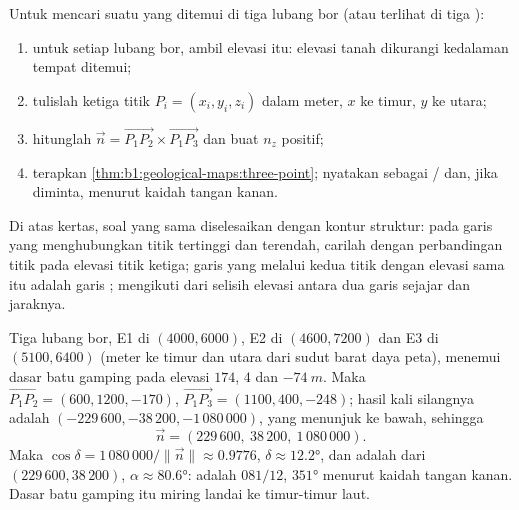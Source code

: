\begin{method}\label{met:b1:geological-maps:three-point}
Untuk mencari  suatu  yang ditemui di tiga lubang bor (atau terlihat di tiga ):
\begin{enumerate}
  \item untuk setiap lubang bor, ambil elevasi  itu: elevasi tanah dikurangi kedalaman tempat  ditemui;
  \item tulislah ketiga titik $P_i = (x_i, y_i, z_i)$ dalam meter, $x$ ke timur, $y$ ke utara;
  \item hitunglah $\vec n = \overrightarrow{P_1P_2} \times
        \overrightarrow{P_1P_3}$ dan buat $n_z$ positif;
  \item terapkan \cref{thm:b1:geological-maps:three-point}; nyatakan  sebagai / dan, jika diminta,  menurut kaidah tangan kanan.
\end{enumerate}
Di atas kertas, soal yang sama diselesaikan dengan kontur struktur: pada garis yang menghubungkan titik tertinggi dan terendah, carilah dengan perbandingan titik pada elevasi titik ketiga; garis yang melalui kedua titik dengan elevasi sama itu adalah garis ;  mengikuti dari selisih elevasi antara dua garis  sejajar dan jaraknya.
\end{method}

\begin{example}\label{ex:b1:geological-maps:east}
Tiga lubang bor, E1 di $(4000, 6000)$, E2 di $(4600, 7200)$ dan E3 di $(5100, 6400)$ (meter ke timur dan utara dari sudut barat daya peta), menemui dasar batu gamping pada elevasi $174$, $4$ dan $\qty{-74}{m}$. Maka
$\overrightarrow{P_1P_2} = (600, 1200, -170)$,
$\overrightarrow{P_1P_3} = (1100, 400, -248)$; hasil kali silangnya adalah
$(-229\,600, -38\,200, -1\,080\,000)$, yang menunjuk ke bawah, sehingga
\[
  \vec n = (229\,600,\ 38\,200,\ 1\,080\,000).
\]
Maka $\cos\delta = 1\,080\,000/\|\vec n\| \approx
0.9776$, $\delta \approx \ang{12.2}$, dan  adalah  dari
$(229\,600, 38\,200)$, $\alpha \approx \ang{80.6}$:  adalah
$081/12$,  $\ang{351}$ menurut kaidah tangan kanan. Dasar batu gamping itu miring landai ke timur-timur laut.
\end{example}

